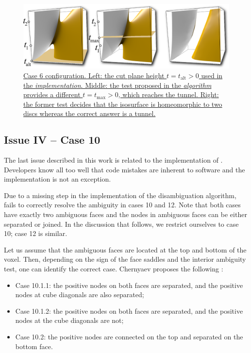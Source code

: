 \begin{figure}
     \centering
    \includegraphics[width=0.95\linewidth]{chapter4/figures/height-plane-problem.png}
     \caption{\href{http://dl.dropbox.com/u/8414964/C-MC33/webpage/figure7.html}{\label{interior_test}Case 6 configuration.
     Left: the cut plane height $t = t_{\mathrm{alt}} > 0$ used in the \mc{} \emph{implementation}. Middle: the test proposed in the \mc{} \emph{algorithm} provides a different $t = t_{\mathrm{max}}> 0$, which reaches the tunnel. Right: the former test decides that the isosurface is homeomorphic to two discs whereas the correct answer is a tunnel.}}
\end{figure}

\subsection{Issue IV -- Case 10}
\label{erros_cause:lewiner}

The last issue described in this work is related to the implementation of \mc{}.
Developers know all too well that code mistakes are inherent to software and the \mc{} implementation is not an exception.

Due to a missing step in the implementation of the disambiguation algorithm, \mc{} fails to correctly resolve the ambiguity in cases 10 and 12. Note that both cases have exactly two ambiguous faces and the nodes in ambiguous faces can be either separated or joined. In the discussion that follows, we restrict ourselves to case 10; case 12 is similar. 

Let us assume that the ambiguous faces are located at the top and bottom of the voxel. Then, depending on the sign of the face saddles and the interior ambiguity test, one can identify the correct case. Chernyaev proposes the following \cite{Chernyaev95marchingcubes}:
\begin{itemize}
\item Case 10.1.1: the positive nodes on both faces are separated, and the positive nodes at cube diagonals are also separated;
\item Case 10.1.2: the positive nodes on both faces are separated, and the positive nodes at the cube diagonals are not;
\item Case 10.2: the positive nodes are connected on the top and separated on the bottom face.
\end{itemize}

